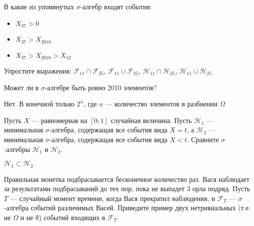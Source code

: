 \begin{solution}
\begin{problem}
В какие из упомянутых $ \sigma $-алгебр входят события:
\begin{itemize}
\item $ X_{37}>0$
\item $ X_{37}>X_{2010}$
\item $ X_{37}>X_{2010}>X_{12}$
\end{itemize}

Упростите выражения: $ \mathcal{F}_{11}\cap \mathcal{F}_{25} $, $ \mathcal{F}_{11}\cup \mathcal{F}_{25} $, $ \mathcal{H}_{11}\cap \mathcal{H}_{25} $, $ \mathcal{H}_{11}\cup \mathcal{H}_{25} $
\end{problem} 
\begin{solution} 

\end{solution}

\begin{problem}
Может ли в $ \sigma $-алгебре быть ровно 2010 элементов?
\end{problem} 
\begin{solution} 
Нет. В конечной только $ 2^{n} $, где $ n $ --- количество элементов в разбиении $ \Omega $
\end{solution}

\begin{problem}
Пусть $X$ --- равномерная на $ [0;1] $ случайная величина. Пусть $ \mathcal{H}_{1} $ --- минимальная $ \sigma $-алгебра, содержащая все события вида $ X=t $, а $ \mathcal{H}_{2} $ --- минимальная $ \sigma $-алгебра, содержащая все события вида $X<t$. Сравните $\sigma$-алгебры $ \mathcal{H}_{1} $ и $ \mathcal{H}_{2} $.
\end{problem} 
\begin{solution} 
$ \mathcal{H}_{1} \subset \mathcal{H}_{2} $
\end{solution}

\begin{problem}
Правильная монетка подбрасывается бесконечное количество раз. Вася наблюдает за результатами подбрасываний до тех пор, пока не выпадет 3 орла подряд. Пусть $ T $ --- случайный момент времени, когда Вася прекратил наблюдения, и $ \mathcal{F}_{T} $ --- $ \sigma $-алгебра событий различимых Васей. Приведите пример двух нетривиальных (т.е. не $ \Omega $ и не $ \emptyset $) событий входящих в $ \mathcal{F}_{T} $.
\end{problem} 
\begin{solution} 

\end{solution}


\end{solution}
